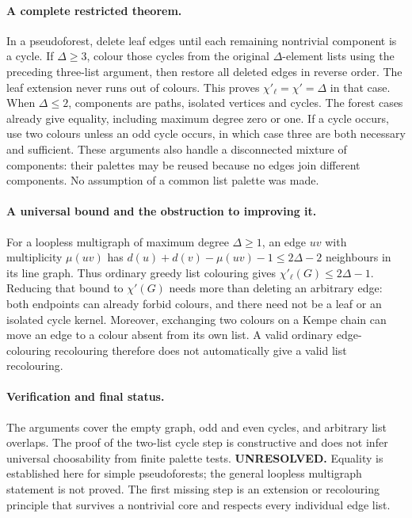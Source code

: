 \documentclass[11pt,a4paper]{article}
\begin{document}
\paragraph{A complete restricted theorem.}
In a pseudoforest, delete leaf edges until each remaining nontrivial
component is a cycle. If $\Delta\ge3$, colour those cycles from the original
$\Delta$-element lists using the preceding three-list argument, then restore
all deleted edges in reverse order. The leaf extension never runs out of
colours. This proves $\chi'_\ell=\chi'=\Delta$ in that case.
When $\Delta\le2$, components are paths, isolated vertices and cycles.
The forest cases already give equality, including maximum degree zero
or one. If a cycle occurs, use two colours unless an odd cycle occurs,
in which case three are both
necessary and sufficient. These arguments also handle a disconnected
mixture of components: their palettes may be reused because no edges join
different components. No assumption of a common list palette was made.

\paragraph{A universal bound and the obstruction to improving it.}
For a loopless multigraph of maximum degree $\Delta\ge1$, an edge $uv$
with multiplicity $\mu(uv)$ has
$d(u)+d(v)-\mu(uv)-1\le2\Delta-2$ neighbours in its line graph.
Thus ordinary greedy list colouring gives
$\chi'_\ell(G)\le2\Delta-1$. Reducing that bound to $\chi'(G)$ needs
more than deleting an arbitrary edge: both endpoints can already forbid
colours, and there need not be a leaf or an isolated cycle kernel.
Moreover, exchanging two colours on a Kempe chain can move an edge to a
colour absent from its own list. A valid ordinary edge-colouring recolouring
therefore does not automatically give a valid list recolouring.

\paragraph{Verification and final status.}
The arguments cover the empty graph, odd and even cycles, and arbitrary
list overlaps. The proof of the two-list cycle step is constructive and
does not infer universal choosability from finite palette tests.
\textbf{UNRESOLVED.} Equality is established here for simple pseudoforests;
the general loopless multigraph statement is not proved. The first missing
step is an extension or recolouring principle that survives a nontrivial
core and respects every individual edge list.
\end{document}
